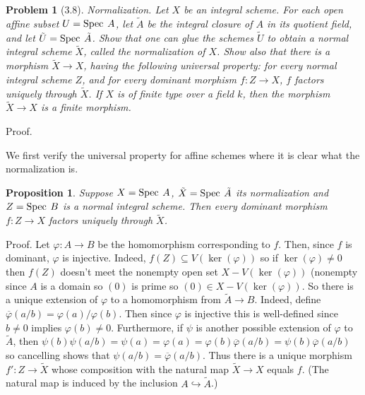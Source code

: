 \documentclass[12pt]{article}
\newtheorem{prob}{Problem}
\newtheorem{prop}{Proposition}
\newcommand{\ol}{\overline}
\renewcommand{\phi}{\varphi}
\newcommand{\spec}{\mbox{\rm Spec \hspace{.01in}}}
\newcommand{\proof}{\mbox{\sc Proof.\hspace{.1in}}}
\begin{document}
\begin{prob}[3.8] 
Normalization. Let $X$ be an integral scheme. For each open affine
subset $U=\spec A$, let $\tilde A$ be the integral closure of $A$
in its quotient field, and let $\tilde U=\spec \tilde A$.
Show that one can glue the schemes $\tilde U$ to obtain a normal integral
scheme $\tilde X$, called the normalization of $X$. Show also that there
is a morphism $\tilde X\rightarrow X$, having the following universal
property: for every normal integral scheme $Z$, and for every
dominant morphism $f:Z\rightarrow X$, $f$ factors uniquely through
$\tilde X$. If $X$ is of finite type over a field $k$, then the morphism
$\tilde X\rightarrow X$ is a finite morphism. 
\end{prob}
\proof 

We first verify the universal property for affine schemes where
it is clear what the normalization is. 
\begin{prop} Suppose $X=\spec A$, $\tilde X=\spec \tilde A$ 
its normalization and $Z=\spec B$ is a normal integral scheme.   
Then every dominant morphism $f:Z\rightarrow X$ factors uniquely
through $\tilde X$. 
\end{prop}
\proof
Let $\phi:A\rightarrow B$ be the homomorphism corresponding to $f$.  
Then, since $f$ is dominant, $\phi$ is injective. Indeed, 
$f(Z)\subseteq V(\ker(\phi))$ so if $\ker(\phi)\not = 0$
then $f(Z)$ doesn't meet the nonempty open set 
$X-V(\ker(\phi))$ (nonempty since $A$ is a domain
so $(0)$ is prime so $(0)\in X-V(\ker(\phi))$. 
So there is a unique extension of $\phi$ to a 
homomorphism from $\tilde A \rightarrow B$. 
Indeed, define $\ol{\phi}(a/b)=\phi(a)/\phi(b)$. Then
since $\phi$ is injective this is well-defined since $b\not=0$
implies $\phi(b)\not=0$. Furthermore, if $\psi$ is another
possible extension of $\phi$ to $\tilde A$, then 
$\psi(b)\psi(a/b)=\psi(a)=\phi(a)=\phi(b)\ol{\phi}(a/b)=\psi(b)\ol{\phi}(a/b)$
so cancelling shows that $\psi(a/b)=\ol{\phi}(a/b)$.  
Thus there is a unique morphism $f':Z\rightarrow
\tilde X$ whose composition with the natural map $\tilde X\rightarrow X$
equals $f$. (The natural map is induced by the inclusion 
$A\hookrightarrow \tilde A$.)   
\end{document}
